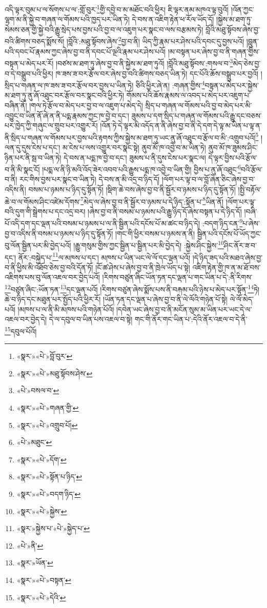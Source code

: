 འདི་ལྟར་བུམ་པ་ལ་སོགས་པ་ལ་:གློ་བུར་\footnote{«སྣར་»«པེ་»བློ་བུར་}གྱི་དབྱེ་བ་མ་མཐོང་བའི་ཕྱིར། ཇི་ལྟར་ནམ་མཁའ་ལྟ་བུའོ། །འོན་ཀྱང་ལྷག་མ་ནི་སྐྱེ་བ་གཞན་ལ་གོམས་པའི་ཁྱད་པར་ཡིན་ཏེ། དེ་བས་ན་འཇིག་རྟེན་ཕ་རོལ་ཡོད་དོ། །སྐྱེས་མ་ཐག་ཏུ་སེམས་ཅན་གྱི་སྐྱེ་བའི་རྒྱུ་སྲེད་པས་བྱས་པའི་བྱ་བ་ལ་འཇུག་པར་སྣང་བ་ལས་བརྩམས་ཏེ། བློའི་མཐུ་སྟོབས་ཞེས་བྱ་བའི་ཚིགས་བཅད་སྨོས་སོ། །བློའི་:མཐུ་སྟོབས་ཞེས་\footnote{«སྣར་»«པེ་»མཐུ་སྟོབས་ཤེས་}བྱ་བ་ནི། ཡིད་ཀྱི་རྣམ་པར་ཤེས་པའི་དབང་དུ་བྱས་པའོ། །བླུན་པའི་དབང་པོ་རྣམས་ཀྱང་ཞེས་བྱ་བ་ནི་དབང་པོ་ལྔའི་རྣམ་པར་ཤེས་པའོ། །མ་བསྟན་པར་ཞེས་བྱ་བ་ནི་གཞན་གྱིས་བསྟན་པ་མེད་པར་རོ། །བཙས་མ་ཐག་ཏུ་ཞེས་བྱ་བ་ནི་སྐྱེས་མ་ཐག་ཏུའོ། །བློའི་མཐུ་སྟོབས་:གསལ་བ་\footnote{«པེ་»བསལ་བ་}མེད་ཅེས་བྱ་བ་དེ་བསྒྲུབ་པའི་ཕྱིར། ཁ་ཟས་ཟ་བར་རྩོལ་བར་ཞེས་བྱ་བའི་ཚིགས་བཅད་ཡིན་ཏེ། དང་པོའི་ཆོས་བསྒྲུབ་པར་བྱའོ། །སྲིད་པ་གཞན་ལ་ཁ་ཟས་ཟ་བར་རྩོལ་བར་བྱས་པ་ཡིན་ཏེ། ཅིའི་ཕྱིར་ཞེ་ན། :གཞན་གྱིས་\footnote{«སྣར་»«པེ་»གཞན་གྱི་}བསྟན་པ་མེད་པར་སྐྱེས་མ་ཐག་ཏུ་ནུ་ཞོ་འཐུང་བར་རྩོལ་བར་སྣང་བའི་ཕྱིར་ཏེ། གོམས་པའི་ཆོས་རྣམས་ལ་འབད་པ་མེད་པར་འཇུག་པ་བཞིན་ནོ། །གལ་ཏེ་རྩོལ་བ་མེད་པར་བྱ་བ་ལ་འཇུག་པ་མེད་དེ། སྲིད་པ་གཞན་ལ་གོམས་པའི་བྱ་བ་མེད་པར་མི་འབྱུང་བ་ཡིན་ནོ་ཞེ་ན་ནི་པདྨ་རྣམས་ཀྱང་ཁ་བྱེ་བ་དང་། ཟུམས་པ་དག་སྲིད་པ་གཞན་ལ་གོམས་པའི་རྒྱུ་དང་བཅས་པར་ཁྱེད་ཀྱི་གཞུང་ལ་གྲུབ་པར་འགྱུར་རོ། །འོན་ཏེ་དེ་ལྟར་མི་འདོད་ན་ནི་ཞེས་བྱ་བ་ནི་དེ་དག་དེ་ལྟ་མ་ཡིན་པ་ལྟ་ན་ནི་སྲིད་པ་གཞན་ལ་གོམས་པར་བྱས་པའི་རྟགས་ཀྱིས་སྐྱེས་མ་ཐག་ཏུ་ཡང་ནུ་ཞོ་འཐུང་བ་རྩོལ་བ་མི་:འགྲུབ་པའོ།\footnote{«སྣར་»«པེ་»འགྲུབ་པོ།} །ལན་དུ་དུས་ངེས་པ་དང་། མ་ངེས་པ་ལས་འགྱུར་བར་སྣང་སྟེ། ནུབ་མོ་ཁ་འབྱེ་བ་མ་ཡིན་ཏེ། ནུབ་མོ་ཁ་ཟུམས་ཤིང་ཉིན་པར་ནི་སྦ་བ་ཡིན་ཏེ། དེ་བས་ན་པདྨ་ཁ་བྱེ་བ་དང་། ཟུམས་པ་ནི་དུས་ངེས་པར་སྣང་ལ། དེ་ལྟར་བྱིས་པའི་རྩོལ་བ་ནི་མི་སྣང་ངོ། །པདྨ་ལ་ནི་ཉི་མའི་འོད་ཟེར་འབབ་པའི་རྒྱུས་པདྨ་ཁ་འབྱེ་བ་ཡིན་གྱི། བྱིས་པ་ནུ་ཞོ་འཐུང་\footnote{«པེ་»མཐུང་}བའི་རྩོལ་བ་ནི། རང་གིས་བྱས་པར་སྣང་བ་ཡིན་ཏེ། དེ་བས་ན་མི་འདྲ་བ་ཉིད་དོ། །ལོག་པར་ལྟ་བ་ལ་བློ་ཞེན་ཅིང་ཞེས་བྱ་བ་འདིས་ནི། བསམ་པ་ཉམས་པ་ཉིད་དུ་སྟོན་ཏོ། །སྡིག་ཆེ་བས་ཞེས་བྱ་བ་ནི་སྦྱོར་བ་ཉམས་པ་ཉིད་དུ་སྟོན་ཏོ། །སྤྱི་བརྟོལ་ཆེ་བ་ལ་གོམས་ཤིང་འཛེམ་དོགས་\footnote{«སྣར་»«པེ་»དོག་}མེད་ལ་ཞེས་བྱ་བ་ནི་སྦྱོར་བ་ཉམས་པ་དེ་ཉིད་:སྟོན་པ་\footnote{«སྣར་»«པེ་»སྟོན་པ་ཉིད་}ཡིན་ནོ། །ལོག་པར་ལྟ་བའི་དུག་གི་སྒྲེགས་པ་དང་འདྲ་བར། །ཞེས་བྱ་བ་ནི་བསམ་པ་ཉམས་པའི་རྒྱུ་ཉིད་དོ་ཞེས་བསྟན་པ་དེ་ཉིད་དོ། །བཞི་པོ་འདི་དག་དང་ལྡན་པའི་བསམ་པ་ཉམས་པ་ལ་ནི་སྦྱིན་པའི་དངོས་པོ་མ་ཚང་བ་ཉིད་དེ། :བདག་ཉིད་ངན་\footnote{«སྣར་»«པེ་»བདག་ཉིད་}པ་ཞེས་བྱ་བ་འདིས་ནི་བསམ་པ་ཉམས་པ་ཉིད་དུ་སྟོན་ཏོ། །གང་གི་ཕྱིར་བསམ་པ་ཉམས་ན་ནི། སྦྱིན་པའི་དངོས་པོ་ཡོད་ཀྱང་བུ་ལོན་སྦྱིན་པར་མི་བྱེད་པའོ། །རྒྱུ་གསུམ་གྱིས་ཀྱང་སྦྱིན་པ་སྦྱིན་པར་མི་བྱེད་དེ། :སྐྱེས་ཤིང་སྐྱེས་\footnote{«སྣར་»«པེ་»སྐྱེས་}ཤིང་ནོར་ཟ་བ་དང་། ནོར་:བསྐྱེད་པ་\footnote{«སྣར་»སྐྱེས་པ་«པེ་»སྐྱེད་པ་}ལ་མཁས་པ་དང་། མཁས་པ་ཡིན་ཡང་ལེ་ལོ་དང་ལྡན་པའོ། །དེ་ཉིད་ཟད་པའི་མཐའ་ཞེས་བྱ་བ་ནི་ཕྱིས་མི་འཐོབ་ཅེས་བྱ་བའི་དོན་ཏོ། །ངོ་ཚ་ཤེས་པ་ཞེས་བྱ་བ་ནི་ཁྲེལ་ཡོད་པ་སྟེ། འཇིག་རྟེན་གྱི་ཁ་ན་མ་ཐོ་བས་འཇིགས་པས་བུ་ལོན་འཇལ་བར་བྱེད་པའོ། །རིགས་བཙུན་ཞིང་ཡོན་ཏན་དང་ལྡན་པ་གང་ཡིན་པ་དེ་:ནི་རིགས་\footnote{«པེ་»ནི་}བཙུན་ཞིང་:ཡོན་ཏན་\footnote{«སྣར་»ཡོན་}དང་ལྡན་པའོ། །རིགས་བཙུན་ཞེས་སྨོས་པས་ནི་བརྐམ་པའི་ཉེས་པ་མེད་པར་སྟོན་\footnote{«སྣར་»«པེ་»བསྟན་}ཏེ། ཆེ་བ་ཉིད་དང་མཐུན་པར་སྤྱོད་པའི་ཕྱིར་རོ། །ཡོན་ཏན་དང་ལྡན་པ་ཞེས་བྱ་བ་ནི་ལེ་ལོའི་གཉེན་པོ་སྟེ། ལེ་ལོ་མེད་པའོ། །མཁས་པ་ལ་ནི་མི་མཁས་པའི་གཉེན་པོའོ། །དབེན་ཡང་ཞེས་བྱ་བ་ནི་མངོན་སུམ་མ་ཡིན་པར་ཡང་དེ་ལ་འཇལ་བར་བྱེད་དེ། དེ་ལ་དབུལ་བ་ཡིན་པས་འཇལ་བ་སྟེ། གང་གི་ནོར་གང་ཡིན་པ་:དེའི་ནོར་འཇལ་བ་དེ་ནི་\footnote{«སྣར་»«པེ་»དེའི་}དབུལ་པོའོ། 